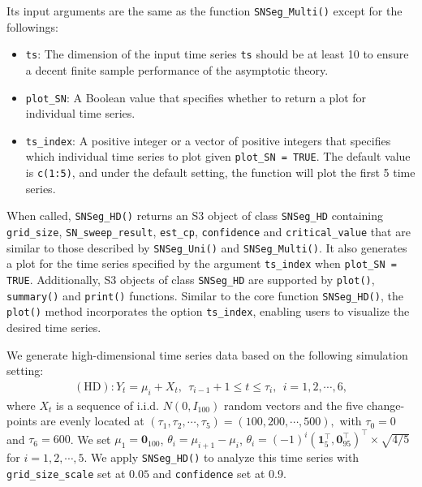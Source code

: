Its input arguments are the same as the function \texttt{SNSeg\_Multi()} except for the followings:

\begin{itemize}
    \item \texttt{ts}: The dimension of the input time series \texttt{ts} should be at least 10 to ensure a decent finite sample performance of the asymptotic theory.
    \item \texttt{plot\_SN}: {A Boolean value that specifies whether to return a plot for individual time series.}    
    \item \texttt{ts\_index}: {A positive integer or a vector of positive integers that specifies which individual time series to plot given \texttt{plot\_SN = TRUE}. The default value is \texttt{c(1:5)}, and under the default setting, the function will plot the first 5 time series.}
\end{itemize}

When called, \texttt{SNSeg\_HD()} returns {an S3 object of class \texttt{SNSeg\_HD}} containing \texttt{grid\_size}, \texttt{SN\_sweep\_result}, \texttt{est\_cp}, \texttt{confidence} and \texttt{critical\_value} that are similar to those described by \texttt{SNSeg\_Uni()} and \texttt{SNSeg\_Multi()}. {It also generates a plot for the time series specified by the argument \texttt{ts\_index} when \texttt{plot\_SN = TRUE}. Additionally, S3 objects of class \texttt{SNSeg\_HD} are supported by \texttt{plot()}, \texttt{summary()} and \texttt{print()} functions. Similar to the core function \texttt{SNSeg\_HD()}, the \texttt{plot()} method incorporates the option \texttt{ts\_index}, enabling users to visualize the desired time series.}


We generate high-dimensional time series data based on the following simulation setting:
\begin{align*}
	(\mathrm{HD}):	Y_t= \mu_{i} + X_t, ~~ \tau_{i-1}+1\leq t\leq \tau_i, ~~ i=1,2,\cdots, 6,
\end{align*}
where $X_t$ is a sequence of i.i.d. $N(0, I_{100})$ random vectors and the five change-points are evenly located at $(\tau_1,\tau_2,\cdots,\tau_5)=(100,200,\cdots,500),$ with $\tau_0=0$ and $\tau_6=600$. We set $\mu_1=\mathbf{0}_{100}$, $\theta_i=\mu_{i+1}-\mu_i$, $\theta_i=(-1)^i (\mathbf{1}_5^\top, \mathbf{0}_{95}^\top)^\top \times \sqrt{4/5}$ for $i =1,2,\cdots,5.$ We apply \texttt{SNSeg\_HD()} to analyze this time series with \texttt{grid\_size\_scale} set at $0.05$ and \texttt{confidence} set at 0.9. 

